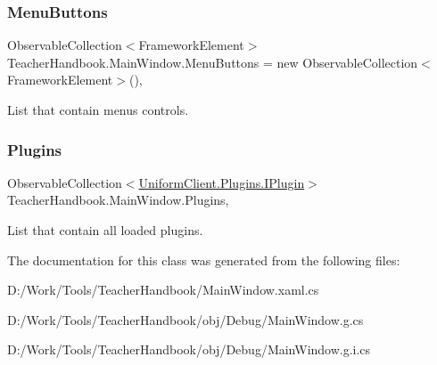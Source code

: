 \subsubsection{\texorpdfstring{Menu\+Buttons}{MenuButtons}}
{\footnotesize\ttfamily Observable\+Collection$<$Framework\+Element$>$ Teacher\+Handbook.\+Main\+Window.\+Menu\+Buttons = new Observable\+Collection$<$Framework\+Element$>$()\hspace{0.3cm}{\ttfamily [get]}, {\ttfamily [set]}}



List that contain menu\textquotesingle{}s controls. 

\mbox{\label{class_teacher_handbook_1_1_main_window_a86e1ee1d12e39fbbd0bc0d7f32e36ad0}} 
\subsubsection{\texorpdfstring{Plugins}{Plugins}}
{\footnotesize\ttfamily Observable\+Collection$<$\mbox{\hyperlink{interface_uniform_client_1_1_plugins_1_1_i_plugin}{Uniform\+Client.\+Plugins.\+I\+Plugin}}$>$ Teacher\+Handbook.\+Main\+Window.\+Plugins\hspace{0.3cm}{\ttfamily [get]}, {\ttfamily [set]}}



List that contain all loaded plugins. 



The documentation for this class was generated from the following files\+:\begin{DoxyCompactItemize}
\item 
D\+:/\+Work/\+Tools/\+Teacher\+Handbook/Main\+Window.\+xaml.\+cs\item 
D\+:/\+Work/\+Tools/\+Teacher\+Handbook/obj/\+Debug/Main\+Window.\+g.\+cs\item 
D\+:/\+Work/\+Tools/\+Teacher\+Handbook/obj/\+Debug/Main\+Window.\+g.\+i.\+cs\end{DoxyCompactItemize}
